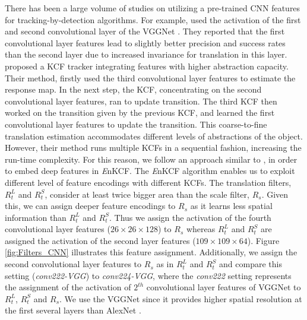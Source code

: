 \documentclass[10pt,twocolumn,letterpaper]{article}
\begin{document}
There has been a large volume of studies on utilizing a pre-trained
CNN features for tracking-by-detection algorithms. For example,
\cite{danelljan2015convolutional} used the activation of the first and
second convolutional layer of the VGGNet \cite{simonyan2014very}.
They reported that the first convolutional layer features lead to
slightly better precision and success rates than the second layer due
to increased invariance for translation in this
layer. \cite{ma2015hierarchical} proposed a KCF tracker integrating
features with higher abstraction capacity. Their method, firstly used
the third convolutional layer features to estimate the response
map. In the next step, the KCF, concentrating on the second
convolutional layer features, ran to update transition. The third KCF
then worked on the transition given by the previous KCF, and learned
the first convolutional layer features to update the transition. This
coarse-to-fine translation estimation accommodates different levels of
abstractions of the object. However, their method runs multiple KCFs
in a sequential fashion, increasing the run-time complexity. For this
reason, we follow an approach similar to
\cite{danelljan2015convolutional}, in order to embed deep features in
     {\it E}nKCF. The {\it E}nKCF algorithm enables us to exploit
     different level of feature encodings with different KCFs. The
     translation filters, $R_{t}^{L}$ and $R_{t}^{S}$, consider at
     least twice bigger area than the scale filter, $R_{s}$. Given
     this, we can assign deeper feature encodings to $R_{s}$ as it
     learns less spatial information than $R_{t}^{L}$ and
     $R_{t}^{S}$. Thus we assign the activation of the fourth
     convolutional layer features ($26\times26\times128$) to $R_{s}$
     whereas $R_{t}^{L}$ and $R_{t}^{S}$ are assigned the activation
     of the second layer features ($109\times109\times64$). Figure
     \ref{fig:Filters_CNN} illustrates this feature
     assignment. Additionally, we assign the second convolutional
     layer features to $R_{s}$ as in $R_{t}^{L}$ and $R_{t}^{S}$ and
     compare this setting (\textit{conv222-VGG}) to
     \textit{conv224-VGG}, where the \textit{conv222} setting
     represents the assignment of the activation of $2^{th}$
     convolutional layer features of VGGNet to $R_{t}^{L}$,
     $R_{t}^{S}$ and $R_{s}$. We use the VGGNet since it provides
     higher spatial resolution at the first several layers than
     AlexNet \cite{krizhevsky2012imagenet}.
\end{document}
